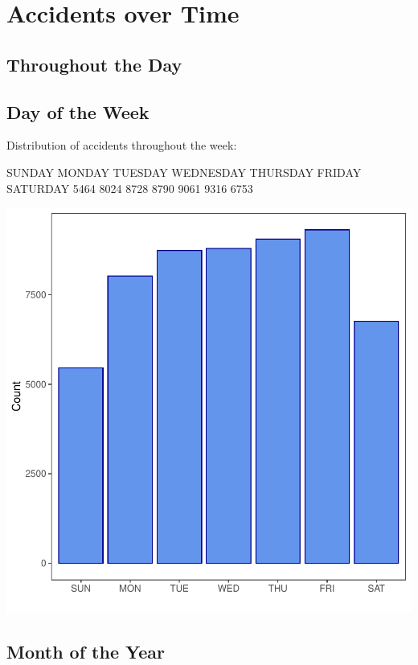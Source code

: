 \documentclass[11pt, a4paper]{article}
\begin{document}
\pagebreak
\section{Accidents over Time}

\subsection{Throughout the Day}



\subsection{Day of the Week} 

Distribution of accidents throughout the week:

\begin{Schunk}
\begin{Soutput}
   SUNDAY    MONDAY   TUESDAY WEDNESDAY  THURSDAY    FRIDAY  SATURDAY 
     5464      8024      8728      8790      9061      9316      6753 
\end{Soutput}
\end{Schunk}
\includegraphics{variableinvestigation-004}


\pagebreak
\subsection{Month of the Year}
\end{document}
